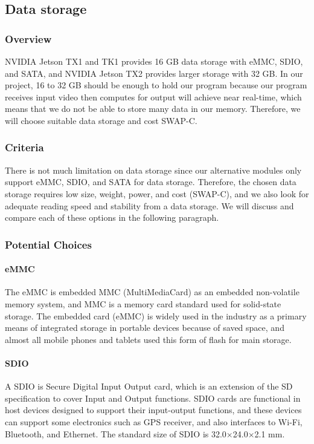 \subsection{Data storage}
\subsubsection{Overview}
NVIDIA Jetson TX1 and TK1 provides 16 GB data storage with eMMC, SDIO, and SATA, and NVIDIA 
Jetson TX2 provides larger storage with 32 GB. In our project, 16 to 32 GB should be enough to 
hold our program because our program receives input video then computes for output will achieve 
near real-time, which means that we do not be able to store many data in our memory. Therefore, 
we will choose suitable data storage and cost SWAP-C. \\


\subsubsection{Criteria}
There is not much limitation on data storage since our alternative modules only support eMMC, SDIO, 
and SATA for data storage. Therefore, the chosen data storage requires low size, weight, power, and
 cost (SWAP-C), and we also look for adequate reading speed and stability from a data storage. We 
 will discuss and compare each of these options in the following paragraph. \\

\subsubsection{Potential Choices}
\paragraph{eMMC}
The eMMC is embedded MMC (MultiMediaCard) as an embedded non-volatile memory system, and MMC is a 
memory card standard used for solid-state storage. The embedded card (eMMC) is widely used in the 
industry as a primary means of integrated storage in portable devices because of saved space, and 
almost all mobile phones and tablets used this form of flash for main storage. \\

\paragraph{SDIO}
A SDIO is Secure Digital Input Output card, which is an extension of the SD specification to cover 
Input and Output functions. SDIO cards are functional in host devices designed to support their 
input-output functions, and these devices can support some electronics such as GPS receiver, and 
also interfaces to Wi-Fi, Bluetooth, and Ethernet. The standard size of SDIO is 32.0×24.0×2.1 mm. \\

